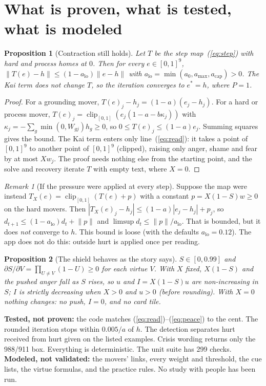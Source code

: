 \documentclass[10pt]{article}
\newtheorem{proposition}{Proposition}
\theoremstyle{remark}
\newtheorem*{remark}{Remark}
\newcommand{\clip}{\operatorname{clip}_{[0,1]}}
\newcommand{\norm}[1]{\lVert #1\rVert}
\begin{document}
\section{What is proven, what is tested, what is modeled}
\begin{proposition}[Contraction still holds]\label{prop:contract}
Let $T$ be the step map~(\ref{eq:step}) with hard and process homes at $0$. Then for every $e\in[0,1]^9$, $\norm{T(e)-h}\le(1-a_{\mathrm{lo}})\norm{e-h}$ with $a_{\mathrm{lo}}=\min(a_0,a_{\max},a_{\mathrm{cap}})>0$. The Kai term does not change $T$, so the iteration converges to $e^\ast=h$, where $P=1$.
\end{proposition}
\begin{proof}
For a grounding mover, $T(e)_j-h_j=(1-a)(e_j-h_j)$. For a hard or process mover, $T(e)_j=\clip(e_j(1-a-b\kappa_j))$ with $\kappa_j=-\sum_g\min(0,W_{gj})h_g\ge0$, so $0\le T(e)_j\le(1-a)e_j$. Summing squares gives the bound. The Kai term enters only line~(\ref{eq:read}): it takes a point of $[0,1]^9$ to another point of $[0,1]^9$ (clipped), raising only anger, shame and fear by at most $X w_j$. The proof needs nothing else from the starting point, and the solve and recovery iterate $T$ with empty text, where $X=0$.
\end{proof}
\begin{remark}[If the pressure were applied at every step]
Suppose the map were instead $T_X(e)=\clip(T(e)+p)$ with a constant $p=X(1-S)w\ge0$ on the hard movers. Then $|T_X(e)_j-h_j|\le(1-a)|e_j-h_j|+p_j$, so $d_{t+1}\le(1-a_{\mathrm{lo}})d_t+\norm{p}$ and $\limsup d_t\le\norm{p}/a_{\mathrm{lo}}$. That is bounded, but it does \emph{not} converge to $h$. This bound is loose (with the defaults $a_{\mathrm{lo}}=0.12$). The app does not do this: outside hurt is applied once per reading.
\end{remark}
\begin{proposition}[The shield behaves as the story says]
$S\in[0,0.99]$ and $\partial S/\partial V=\prod_{U\neq V}(1-U)\ge0$ for each virtue $V$. With $X$ fixed, $X(1-S)$ and the pushed anger fall as $S$ rises, so $u$ and $I=X(1-S)u$ are non-increasing in $S$; $I$ is strictly decreasing when $X>0$ and $u>0$ (before rounding). With $X=0$ nothing changes: no push, $I=0$, and no card tile.
\end{proposition}
\noindent\textbf{Tested, not proven:} the code matches (\ref{eq:read})--(\ref{eq:peace}) to the cent. The rounded iteration stops within $0.005/a$ of $h$. The detection separates hurt received from hurt given on the listed examples. Crisis wording returns only the 988/911 box. Everything is deterministic. The unit suite has 299 checks. \textbf{Modeled, not validated:} the movers' links, every weight and threshold, the cue lists, the virtue formulas, and the practice rules. No study with people has been run.
\end{document}
